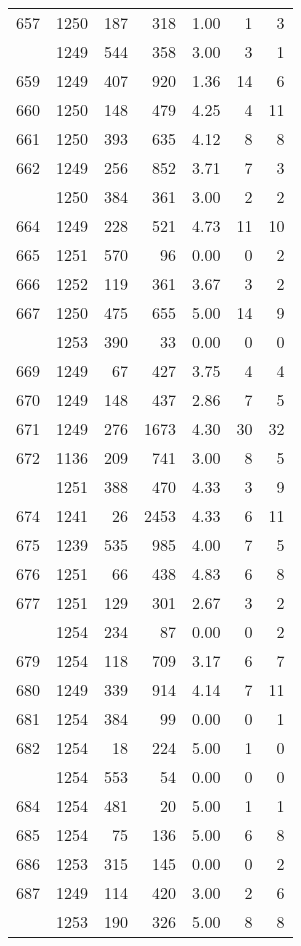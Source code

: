 \documentclass[
]{article}
\begin{document}
\begin{table}
\begin{tabular}[t]{lrrrrrr}
657 & 1250 & 187 & 318 & 1.00 & 1 & 3\\
\addlinespace
658 & 1249 & 544 & 358 & 3.00 & 3 & 1\\
659 & 1249 & 407 & 920 & 1.36 & 14 & 6\\
660 & 1250 & 148 & 479 & 4.25 & 4 & 11\\
661 & 1250 & 393 & 635 & 4.12 & 8 & 8\\
662 & 1249 & 256 & 852 & 3.71 & 7 & 3\\
\addlinespace
663 & 1250 & 384 & 361 & 3.00 & 2 & 2\\
664 & 1249 & 228 & 521 & 4.73 & 11 & 10\\
665 & 1251 & 570 & 96 & 0.00 & 0 & 2\\
666 & 1252 & 119 & 361 & 3.67 & 3 & 2\\
667 & 1250 & 475 & 655 & 5.00 & 14 & 9\\
\addlinespace
668 & 1253 & 390 & 33 & 0.00 & 0 & 0\\
669 & 1249 & 67 & 427 & 3.75 & 4 & 4\\
670 & 1249 & 148 & 437 & 2.86 & 7 & 5\\
671 & 1249 & 276 & 1673 & 4.30 & 30 & 32\\
672 & 1136 & 209 & 741 & 3.00 & 8 & 5\\
\addlinespace
673 & 1251 & 388 & 470 & 4.33 & 3 & 9\\
674 & 1241 & 26 & 2453 & 4.33 & 6 & 11\\
675 & 1239 & 535 & 985 & 4.00 & 7 & 5\\
676 & 1251 & 66 & 438 & 4.83 & 6 & 8\\
677 & 1251 & 129 & 301 & 2.67 & 3 & 2\\
\addlinespace
678 & 1254 & 234 & 87 & 0.00 & 0 & 2\\
679 & 1254 & 118 & 709 & 3.17 & 6 & 7\\
680 & 1249 & 339 & 914 & 4.14 & 7 & 11\\
681 & 1254 & 384 & 99 & 0.00 & 0 & 1\\
682 & 1254 & 18 & 224 & 5.00 & 1 & 0\\
\addlinespace
683 & 1254 & 553 & 54 & 0.00 & 0 & 0\\
684 & 1254 & 481 & 20 & 5.00 & 1 & 1\\
685 & 1254 & 75 & 136 & 5.00 & 6 & 8\\
686 & 1253 & 315 & 145 & 0.00 & 0 & 2\\
687 & 1249 & 114 & 420 & 3.00 & 2 & 6\\
\addlinespace
688 & 1253 & 190 & 326 & 5.00 & 8 & 8\\

\end{tabular}
\end{table}
\end{document}
